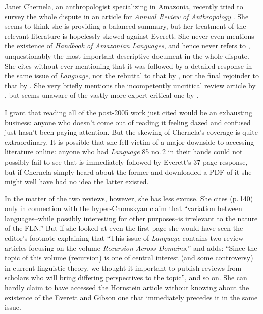 \documentclass[output=paper,colorlinks,citecolor=brown
]{langscibook}
\begin{document}
Janet Chernela, an anthropologist specializing in Amazonia, recently
tried to survey the whole dispute in an article for \textit{Annual
Review of Anthropology} \citep{Chernela23}. She seems to think she
is providing a balanced summary, but her treatment of the relevant
literature is hopelessly skewed against Everett. She never even
mentions the existence of \textit{Handbook of Amazonian Languages},
and hence never refers to \citet{Everett86HAL}, unquestionably the
most important descriptive document in the whole dispute. She cites
\citet{NevPesRod09a} without ever mentioning that it was followed by
a detailed response \citep{Everett09} in the same issue of
\textit{Language}, nor the rebuttal to that by \citet{NevPesRod09b},
nor the final rejoinder to that by \citet{Everett13}. She very
briefly mentions the incompetently uncritical review article by
\citet{Hornstein19}, but seems unaware of the vastly more expert
critical one by \citet{EverGibs19}.

I grant that reading all of the post-2005 work just cited would be
an exhausting business: anyone who doesn't come out of reading it
feeling dazed and confused just hasn't been paying attention. But
the skewing of Chernela's coverage is quite extraordinary. It is
possible that she fell victim of a major downside to accessing
literature online: anyone who had \textit{Language} 85 no.\,2 in
their hands could not possibly fail to see that \citet{NevPesRod09a}
is immediately followed by Everett's 37-page response, but if Chernela
simply heard about the former and downloaded a PDF of it she might well
have had no idea the latter existed.

In the matter of the two reviews, however, she has less excuse. She
cites \citet{Hornstein19} (p.\,140) only in connection with the
hyper-Chomskyan claim that ``variation between languages--while
possibly interesting for other purposes--is irrelevant to the nature
of the FLN.'' But if she looked at even the first page she would have
seen the editor's footnote explaining that ``This issue of
\textit{Language} contains two review articles focusing on the
volume \textit{Recursion Across Domains},'' and adds: ``Since the
topic of this volume (recursion) is one of central interest (and some
controversy) in current linguistic theory, we thought it important
to publish reviews from scholars who will bring differing perspectives
to the topic'', and so on. She can hardly claim to have accessed the
Hornstein article without knowing about the existence of the Everett
and Gibson one that immediately precedes it in the same issue.
\end{document}
